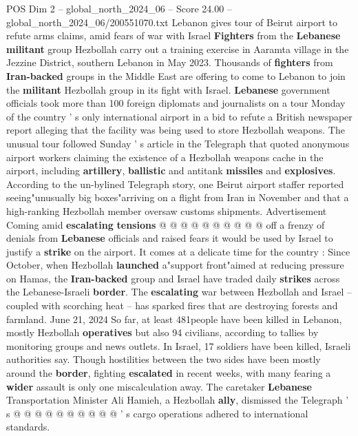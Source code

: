 \begin{textsample}{POS Dim 2 – global\_north\_2024\_06 – Score 24.00 – global\_north\_2024\_06/200551070.txt}  \label{ex:f2_pos_313}
Lebanon gives tour of Beirut airport to refute arms claims, amid fears of war with Israel \textbf{Fighters} from the \textbf{Lebanese} \textbf{militant} group Hezbollah carry out a training exercise in Aaramta village in the Jezzine District, southern Lebanon in May 2023.
Thousands of \textbf{fighters} from \textbf{Iran-backed} groups in the Middle East are offering to come to Lebanon to join the \textbf{militant} Hezbollah group in its fight with Israel. \textbf{Lebanese} government officials took more than 100 foreign diplomats and journalists on a tour Monday of the country ' s only international airport in a bid to refute a British newspaper report alleging that the facility was being used to store Hezbollah weapons.
The unusual tour followed Sunday ' s article in the Telegraph that quoted anonymous airport workers claiming the existence of a Hezbollah weapons cache in the airport, including \textbf{artillery}, \textbf{ballistic} and antitank \textbf{missiles} and \textbf{explosives}.
According to the un-bylined Telegraph story, one Beirut airport staffer reported seeing"unusually big boxes"arriving on a flight from Iran in November and that a high-ranking Hezbollah member oversaw customs shipments.
Advertisement Coming amid \textbf{escalating} \textbf{tensions} @ @ @ @ @ @ @ @ @ @ off a frenzy of denials from \textbf{Lebanese} officials and raised fears it would be used by Israel to justify a \textbf{strike} on the airport.
It comes at a delicate time for the country : Since October, when Hezbollah \textbf{launched} a"support front"aimed at reducing pressure on Hamas, the \textbf{Iran-backed} group and Israel have traded daily \textbf{strikes} across the Lebanese-Israeli \textbf{border}.
The \textbf{escalating} war between Hezbollah and Israel -- coupled with scorching heat -- has sparked fires that are destroying forests and farmland.
June 21, 2024 So far, at least 481people have been killed in Lebanon, mostly Hezbollah \textbf{operatives} but also 94 civilians, according to tallies by monitoring groups and news outlets.
In Israel, 17 soldiers have been killed, Israeli authorities say.
Though hostilities between the two sides have been mostly around the \textbf{border}, fighting \textbf{escalated} in recent weeks, with many fearing a \textbf{wider} assault is only one miscalculation away.
The caretaker \textbf{Lebanese} Transportation Minister Ali Hamieh, a Hezbollah \textbf{ally}, dismissed the Telegraph ' s @ @ @ @ @ @ @ @ @ @ ' s cargo operations adhered to international standards.

\end{textsample}
